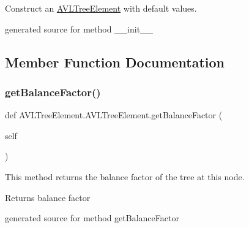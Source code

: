 Construct an \hyperlink{class_a_v_l_tree_element_1_1_a_v_l_tree_element}{A\+V\+L\+Tree\+Element} with default values. 

\begin{DoxyVerb}generated source for method __init__ \end{DoxyVerb}
 

\subsection{Member Function Documentation}
\hypertarget{class_a_v_l_tree_element_1_1_a_v_l_tree_element_afb67818659c75a5e5105b26ee8ed94e4}{}\label{class_a_v_l_tree_element_1_1_a_v_l_tree_element_afb67818659c75a5e5105b26ee8ed94e4} 
\subsubsection{\texorpdfstring{get\+Balance\+Factor()}{getBalanceFactor()}}
{\footnotesize\ttfamily def A\+V\+L\+Tree\+Element.\+A\+V\+L\+Tree\+Element.\+get\+Balance\+Factor (\begin{DoxyParamCaption}\item[{}]{self }\end{DoxyParamCaption})}



This method returns the balance factor of the tree at this node. 

\begin{DoxyReturn}{Returns}
balance factor\begin{DoxyVerb}generated source for method getBalanceFactor \end{DoxyVerb}
 
\end{DoxyReturn}
\hypertarget{class_a_v_l_tree_element_1_1_a_v_l_tree_element_a640287202eba6921fbd438adb7cb49bf}{}\label{class_a_v_l_tree_element_1_1_a_v_l_tree_element_a640287202eba6921fbd438adb7cb49bf} 
